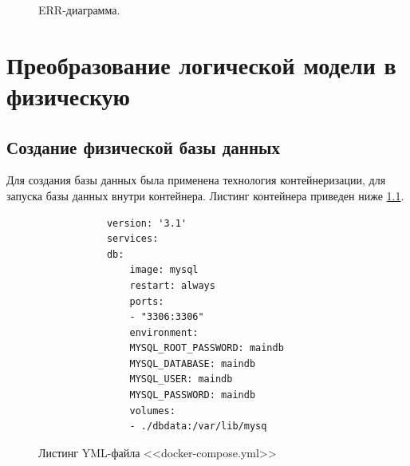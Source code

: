\documentclass[14pt]{extreport}
\begin{document}
    \begin{figure}[H]%
        \centering
        \caption{ERR-диаграмма.}
        \label{ERR} 
       \end{figure}


\chapter{Преобразование логической модели в физическую}

\section{Создание физической базы данных}

    Для создания базы данных была применена технология контейнеризации, для запуска базы данных внутри контейнера.%
    Листинг контейнера приведен ниже \ref{docker}.

    \begin{figure}[H]
        \begin{verbatim}
            version: '3.1'
            services:
            db:
                image: mysql
                restart: always
                ports:
                - "3306:3306"
                environment:
                MYSQL_ROOT_PASSWORD: maindb
                MYSQL_DATABASE: maindb
                MYSQL_USER: maindb
                MYSQL_PASSWORD: maindb
                volumes:
                - ./dbdata:/var/lib/mysq
        \end{verbatim}
        \caption{Листинг YML-файла <<docker-compose.yml>>}
        \label{docker}
    \end{figure}
\end{document}
